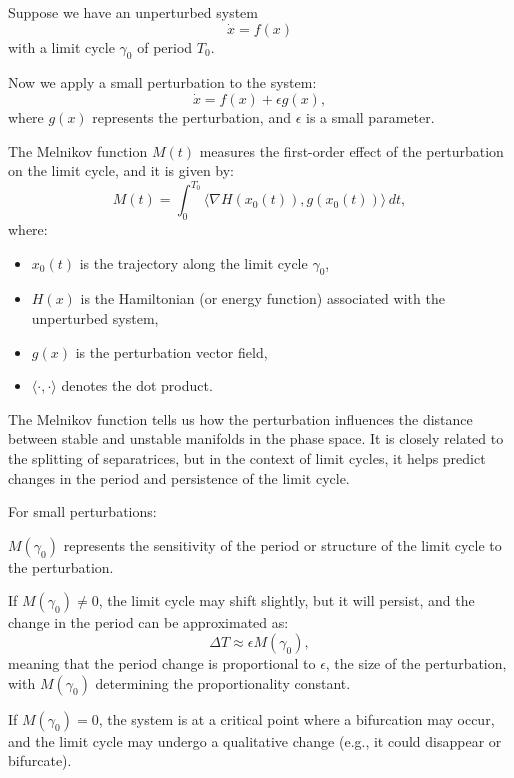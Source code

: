\documentclass{article}
\theoremstyle{definition}
\theoremstyle{remark}
\begin{document}
Suppose we have an unperturbed system
\[
\dot{x} = f(x)
\]
with a limit cycle \(\gamma_0\) of period \(T_0\).

Now we apply a small perturbation to the system:
\[
\dot{x} = f(x) + \epsilon g(x),
\]
where \(g(x)\) represents the perturbation, and \(\epsilon\) is a small parameter.

The Melnikov function \(M(t)\) measures the first-order effect of the perturbation on the limit cycle, and it is given by:
\[
M(t) = \int_0^{T_0} \langle \nabla H(x_0(t)), g(x_0(t)) \rangle \, dt,
\]
where:
\begin{itemize}
    \item \(x_0(t)\) is the trajectory along the limit cycle \(\gamma_0\),
    \item \(H(x)\) is the Hamiltonian (or energy function) associated with the unperturbed system,
    \item \(g(x)\) is the perturbation vector field,
    \item \(\langle \cdot, \cdot \rangle\) denotes the dot product.
\end{itemize}

The Melnikov function tells us how the perturbation influences the distance between stable and unstable manifolds in the phase space. It is closely related to the splitting of separatrices, but in the context of limit cycles, it helps predict changes in the period and persistence of the limit cycle.

For small perturbations:

\(M(\gamma_0)\) represents the sensitivity of the period or structure of the limit cycle to the perturbation.

If \(M(\gamma_0) \neq 0\), the limit cycle may shift slightly, but it will persist, and the change in the period can be approximated as:
\[
\Delta T \approx \epsilon M(\gamma_0),
\]
meaning that the period change is proportional to \(\epsilon\), the size of the perturbation, with \(M(\gamma_0)\) determining the proportionality constant.

If \(M(\gamma_0) = 0\), the system is at a critical point where a bifurcation may occur, and the limit cycle may undergo a qualitative change (e.g., it could disappear or bifurcate).
\end{document}
